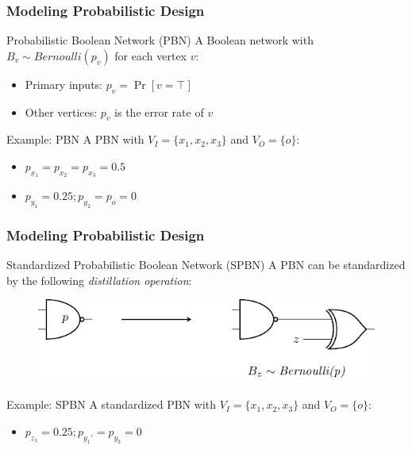 \begin{frame}
  \frametitle{Modeling Probabilistic Design}
  \begin{block}{Probabilistic Boolean Network (PBN)}
    A Boolean network with $B_v\sim\textit{Bernoulli}(p_v)$ for each vertex $v$:
    \pause
    \begin{itemize}
      \item Primary inputs: $p_v=\Pr[v=\top]$
            \pause
      \item Other vertices: $p_v$ is the error rate of $v$
    \end{itemize}
  \end{block}
  \pause
  \begin{block}{Example: PBN}
    A PBN with $V_I=\{x_1,x_2,x_3\}$ and $V_O=\{o\}$:
    \begin{figure}
      \centering
      
    \end{figure}
    \pause
    \begin{itemize}
      \item $p_{x_1}=p_{x_2}=p_{x_3}=0.5$
            \pause
      \item $p_{y_1}=0.25;p_{y_2}=p_{o}=0$
    \end{itemize}
  \end{block}
\end{frame}

\begin{frame}
  \frametitle{Modeling Probabilistic Design}
  \begin{block}{Standardized Probabilistic Boolean Network (SPBN)}
    A PBN can be standardized by the following \textit{distillation operation}:
    \pause
    \begin{figure}
      \centering
      \includegraphics[scale=0.8]{fig/prob-design-eval/prob-distillation.pdf}
    \end{figure}
  \end{block}
  \pause
  \begin{block}{Example: SPBN}
    A standardized PBN with $V_I=\{x_1,x_2,x_3\}$ and $V_O=\{o\}$:
    \begin{figure}
      \centering
      
    \end{figure}
    \pause
    \begin{itemize}
      \item $p_{z_1}=0.25;p_{y_1'}=p_{y_3}=0$
    \end{itemize}
  \end{block}
\end{frame}
